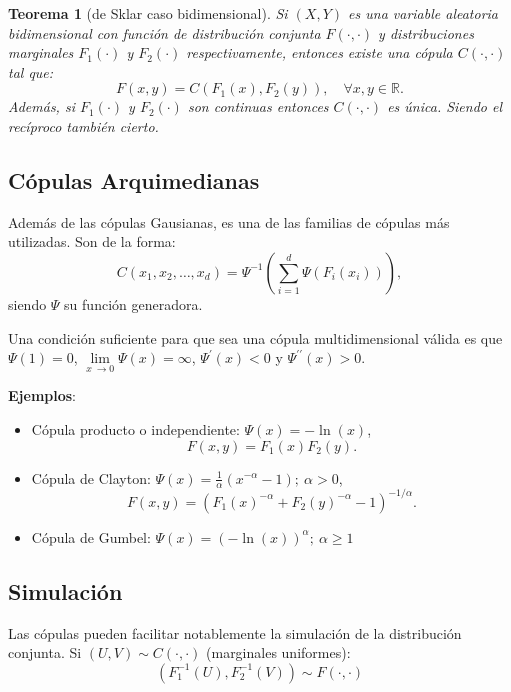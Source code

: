 \documentclass[
  10pt,
]{book}
\theoremstyle{break}
\newtheorem{theorem}{Teorema}[chapter]
\theoremstyle{nonumberplain}
\begin{document}
\begin{theorem}[de Sklar caso bidimensional]
\protect\hypertarget{thm:sklar}{}\label{thm:sklar}
Si \((X,Y)\) es una variable aleatoria bidimensional con función de distribución conjunta \(F(\cdot,\cdot)\) y distribuciones marginales \(F_1(\cdot)\) y \(F_2(\cdot)\) respectivamente, entonces existe una cópula \(C(\cdot,\cdot)\) tal que:
\[F(x,y)=C\left( F_1(x),F_2(y)\right) ,\quad \forall x,y\in\mathbb{R}.\]
Además, si \(F_1(\cdot)\) y \(F_2(\cdot)\) son continuas entonces \(C(\cdot,\cdot)\) es única.
Siendo el recíproco también cierto.
\end{theorem}

\hypertarget{cuxf3pulas-arquimedianas}{%
\subsection{Cópulas Arquimedianas}\label{cuxf3pulas-arquimedianas}}

Además de las cópulas Gausianas, es una de las familias de cópulas más utilizadas.
Son de la forma:
\[C(x_1,x_2,\dots,x_d)
= \Psi^{-1}\left( \sum_{i=1}^d\Psi\left( F_i(x_i)\right)\right),\]
siendo \(\Psi\) su función generadora.

Una condición suficiente para que sea una cópula multidimensional válida es que \(\Psi(1)=0\), \(\lim \limits_{x\ \rightarrow0}\Psi(x)= \infty\), \(\Psi^{\prime}(x)<0\) y \(\Psi^{\prime \prime}(x)>0\).

\textbf{Ejemplos}:

\begin{itemize}
\item
  Cópula producto o independiente:
  \(\Psi(x)=-\ln(x)\),
  \[F(x,y)=F_1(x)F_2(y).\]
\item
  Cópula de Clayton:
  \(\Psi(x)= \frac{1}{\alpha}\left( x^{-\alpha}-1\right) ;\ \alpha>0\),
  \[F(x,y)=(F_1(x)^{-\alpha}+F_2(y)^{-\alpha}-1)^{-1/\alpha}.\]
\item
  Cópula de Gumbel:
  \(\Psi(x)= \left( -\ln(x)\right)^{\alpha} ;\ \alpha \geq1\)
\end{itemize}

\hypertarget{simulaciuxf3n}{%
\subsection{Simulación}\label{simulaciuxf3n}}

Las cópulas pueden facilitar notablemente la simulación de la distribución conjunta.
Si \((U,V)\sim C(\cdot,\cdot)\) (marginales uniformes):
\[\left( F_1^{-1}(U),F_2^{-1}(V)\right)  \sim F(\cdot,\cdot)\]
\end{document}

